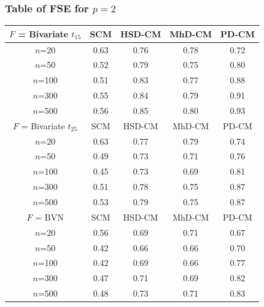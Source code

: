 \documentclass[handout,10pt]{beamer}
\begin{document}
\begin{frame}
\frametitle{Table of FSE for $p=2$}
\begin{table}
\begin{footnotesize}
   \begin{tabular}{c|cccc}
    \hline
    $F$ = Bivariate $t_{15}$ & SCM  & HSD-CM & MhD-CM & PD-CM \\ \hline
    $n$=20                        & 0.63 & 0.76   & 0.78   & 0.72  \\
    $n$=50                        & 0.52 & 0.79   & 0.75   & 0.80  \\
    $n$=100                       & 0.51 & 0.83   & 0.77   & 0.88  \\
    $n$=300                       & 0.55 & 0.84   & 0.79   & 0.91  \\
    $n$=500                       & 0.56 & 0.85   & 0.80   & 0.93  \\ \hline
    $F$ = Bivariate $t_{25}$ & SCM  & HSD-CM & MhD-CM & PD-CM \\ \hline
    $n$=20                        & 0.63 & 0.77   & 0.79   & 0.74  \\
    $n$=50                        & 0.49 & 0.73   & 0.71   & 0.76  \\
    $n$=100                       & 0.45 & 0.73   & 0.69   & 0.81  \\
    $n$=300                       & 0.51 & 0.78   & 0.75   & 0.87  \\
    $n$=500                       & 0.53 & 0.79   & 0.75   & 0.87  \\ \hline
    $F$ = BVN                     & SCM  & HSD-CM & MhD-CM & PD-CM \\ \hline
    $n$=20                        & 0.56 & 0.69   & 0.71   & 0.67  \\
    $n$=50                        & 0.42 & 0.66   & 0.66   & 0.70  \\
    $n$=100                       & 0.42 & 0.69   & 0.66   & 0.77  \\
    $n$=300                       & 0.47 & 0.71   & 0.69   & 0.82  \\
    $n$=500                       & 0.48 & 0.73   & 0.71   & 0.83  \\ \hline
    \end{tabular}
\end{footnotesize}
\label{table:FSEtable2}
\end{table}
\end{frame}
\end{document}
